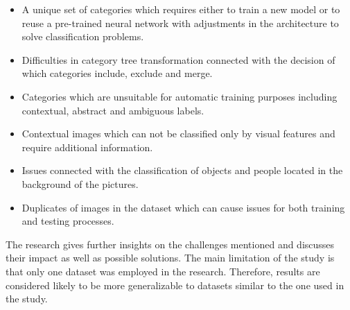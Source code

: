 \begin{itemize}
    \item A unique set of categories which requires either to train a new model or to reuse a pre-trained neural network with adjustments in the architecture to solve classification problems.
    \item Difficulties in category tree transformation connected with the decision of which categories include, exclude and merge.
    \item Categories which are unsuitable for automatic training purposes including contextual, abstract and ambiguous labels.
    \item Contextual images which can not be classified only by visual features and require additional information.
    \item Issues connected with the classification of objects and people located in the background of the pictures.
    \item Duplicates of images in the dataset which can cause issues for both training and testing processes.
\end{itemize}

The research gives further insights on the challenges mentioned and discusses their impact as well as possible solutions. The main limitation of the study is that only one dataset was employed in the research. Therefore, results are considered likely to be more generalizable to datasets similar to the one used in the study. 